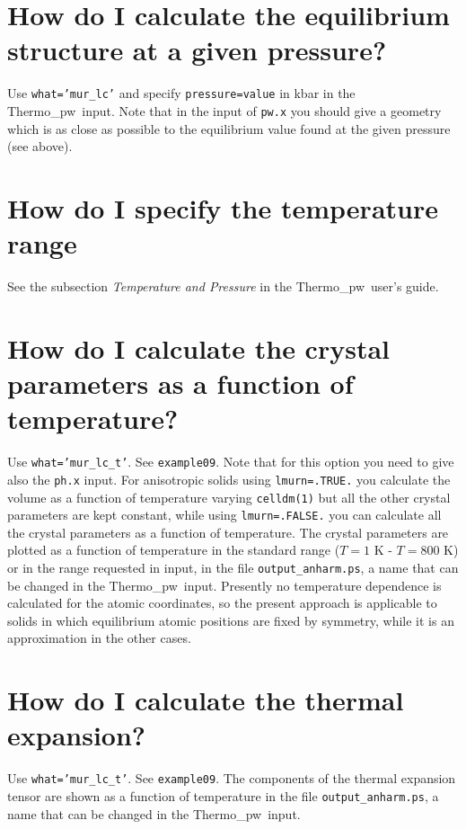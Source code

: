 \documentclass[12pt,a4paper,twoside]{report}
\def\thermo{{\sc Thermo}\_{\sc pw}}
\begin{document}
\newpage
{\color{coral}\section{How do I calculate the equilibrium structure 
at a given pressure?}}
\color{black}
Use \texttt{what='mur\_lc'} and specify \texttt{pressure=value} in kbar in the
\thermo\ input. Note that in the input of \texttt{pw.x} you should 
give a geometry which is as close as possible to the equilibrium value
found at the given pressure (see above).

\newpage
{\color{coral}\section{How do I specify the temperature range}} 
\color{black}
See the subsection {\it Temperature and Pressure} in the 
\thermo\ user's guide. 

\newpage
{\color{coral}\section{How do I calculate the crystal parameters as a function
of temperature?}}
\color{black}
Use \texttt{what='mur\_lc\_t'}. See \texttt{example09}. Note that
for this option you need to give also the \texttt{ph.x} input.
For anisotropic solids using \texttt{lmurn=.TRUE.} you calculate 
the volume as a function of temperature varying \texttt{celldm(1)} 
but all the other crystal parameters are kept constant, while
using \texttt{lmurn=.FALSE.} you can calculate all the crystal
parameters as a function of temperature.
The crystal parameters are plotted as a function of temperature
in the standard range ($T=1$ K - $T=800$ K) or in the range  
requested in input, in the file 
\texttt{output\_anharm.ps}, a name that can be changed in the \thermo\ input.
Presently no temperature dependence is calculated 
for the atomic coordinates, so the present approach is applicable
to solids in which equilibrium atomic positions are fixed by 
symmetry, while it is an approximation in the other cases.

\newpage
{\color{coral}\section{How do I calculate the thermal expansion?}}
\color{black}
Use \texttt{what='mur\_lc\_t'}. See \texttt{example09}. The components
of the thermal expansion tensor are shown as a function of temperature 
in the file \texttt{output\_anharm.ps}, a name that can be changed in 
the \thermo\ input.
\end{document}
